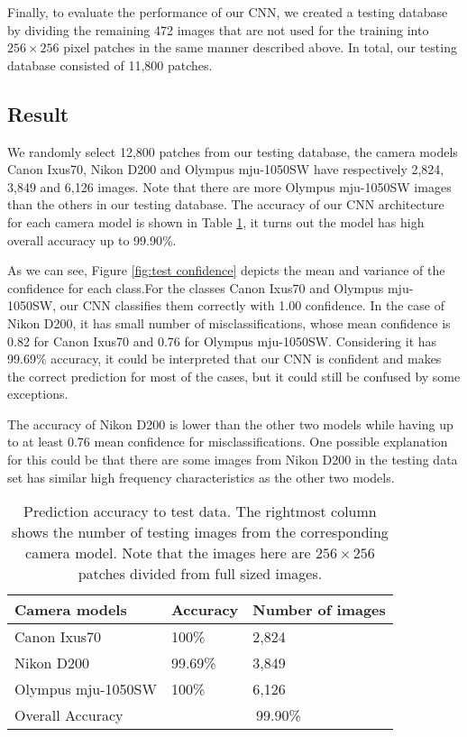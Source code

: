 \documentclass[a4paper, 9pt, twocolumn]{extarticle}
\begin{document}
Finally, to evaluate the performance of our CNN, we created a testing database by dividing the remaining 472 images that are not used for the training into $ 256 \times 256 $ pixel patches in the same manner described above. In total, our testing database consisted of 11,800 patches.

\subsection*{Result}
\label{section:Result}

We randomly select 12,800 patches from our testing database, the camera models Canon Ixus70, Nikon D200 and Olympus mju-1050SW have respectively 2,824, 3,849 and 6,126 images. Note that there are more Olympus mju-1050SW images than the others in our testing database. The accuracy of our CNN architecture for each camera model is shown in Table \ref{tab:train}, it turns out the model has high overall accuracy up to 99.90\%. 

As we can see, Figure \ref{fig:test confidence} depicts the mean and variance of the confidence for each class.For the classes Canon Ixus70 and Olympus mju-1050SW, our CNN classifies them correctly with 1.00 confidence. In the case of Nikon D200, it has small number of misclassifications, whose mean confidence is 0.82 for Canon Ixus70 and 0.76 for Olympus mju-1050SW. Considering it has 99.69\% accuracy, it could be interpreted that our CNN is confident and makes the correct prediction for most of the cases, but it could still be confused by some exceptions.

The accuracy of Nikon D200 is lower than the other two models while having up to at least 0.76 mean confidence for misclassifications. One possible explanation for this could be that there are some images from Nikon D200 in the testing data set has similar high frequency characteristics as the other two models.

\begin{table}
	\center
	\begin{tabular}{ |p{3.2cm}|p{1.4cm}|p{2.6cm}| }
		\hline
		Camera models & Accuracy & Number of images\\
		\hline
		Canon Ixus70 & 100\% & 2,824 \\
		Nikon D200 & 99.69\% & 3,849 \\
		Olympus mju-1050SW & 100\% & 6,126 \\
		\hline
		Overall Accuracy & \multicolumn{2}{c|}{99.90\%} \\
		\hline
	\end{tabular}
	\caption{\label{tab:train} Prediction accuracy to test data. The rightmost column shows the number of testing images from the corresponding camera model. Note that the images here are $ 256 \times 256 $ patches divided from full sized images.}
\end{table}
\end{document}
